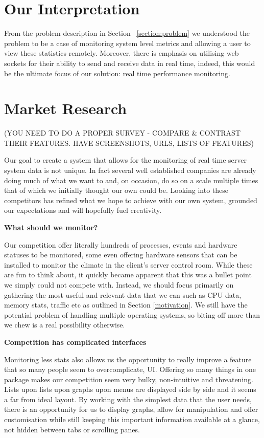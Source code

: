 \documentclass{l3proj}
\begin{document}
\section{Our Interpretation}


From the problem description in Section ~\ref{section:problem} we understood the problem to be a case of monitoring system level metrics and allowing a user to view these statistics remotely. Moreover, there is emphasis on utilising web sockets for their ability to send and receive data in real time, indeed, this would be the ultimate focus of our solution: real time performance monitoring.

\section{Market Research}
\label{section:MarketResearch}


(YOU NEED TO DO A PROPER SURVEY - COMPARE \& CONTRAST THEIR FEATURES. HAVE SCREENSHOTS, URLS, LISTS OF FEATURES)

Our goal to create a system that allows for the monitoring of real time server system data is not unique. In fact several well established companies are already doing much of what we want to and, on occasion, do so on a scale multiple times that of which we initially thought our own could be. Looking into these competitors has refined what we hope to achieve with our own system, grounded our expectations and will hopefully fuel creativity.

\textbf{What should we monitor?}

Our competition offer literally hundreds of processes, events and hardware statuses to be monitored, some even offering hardware sensors that can be installed to monitor the climate in the client’s server control room. While these are fun to think about, it quickly became apparent that this was a bullet point we simply could not compete with. Instead, we should focus primarily on gathering the most useful and relevant data that we can such as CPU data, memory stats, traffic etc as outlined in Section \ref{motivation}. We still have the potential problem of handling multiple operating systems, so biting off more than we chew is a real possibility otherwise.

\textbf{Competition has complicated interfaces}

Monitoring less stats also allows us the opportunity to really improve a feature that so many people seem to overcomplicate, UI. Offering so many things in one package makes our competition seem very bulky, non-intuitive and threatening. Lists upon lists upon graphs upon menus are displayed side by side and it seems a far from ideal layout. By working with the simplest data that the user needs, there is an opportunity for us to display graphs, allow for manipulation and offer customisation while still keeping this important information available at a glance, not hidden between tabs or scrolling panes.
\end{document}
